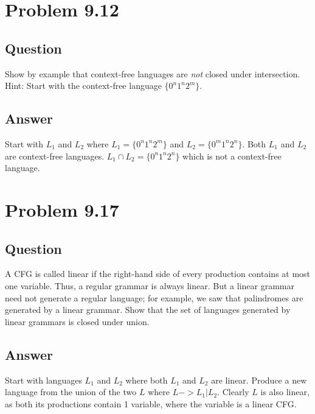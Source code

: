 \documentclass[12pt, a4paper]{article}
\begin{document}
\section{Problem 9.12}
\subsection{Question}
Show by example that context-free languages are \textit{not} closed under intersection. Hint: Start with the context-free language $\{0^{n}1^{n}2^{m}\}$.
\subsection{Answer}
Start with $L_{1}$ and $L_{2}$ where $L_{1} = \{0^{n}1^{n}2^{m}\}$ and $L_{2} = \{0^{m}1^{n}2^{n}\}$. Both $L_{1}$ and $L_{2}$ are context-free languages. $L_{1} \cap L_{2} = \{0^{n}1^{n}2^{n}\}$ which is not a context-free language.

\section{Problem 9.17}
\subsection{Question}
A CFG is called linear if the right-hand side of every production contains at most one variable. Thus, a regular grammar is always linear. But a linear grammar need not generate a regular language; for example, we saw that palindromes are generated by a linear grammar. Show that the set of languages generated by linear grammars is closed under union.
\subsection{Answer}
Start with languages $L_{1}$ and $L_{2}$ where both $L_{1}$ and $L_{2}$ are linear. Produce a new language from the union of the two $L$ where $L -> L_{1} | L_{2}$. Clearly $L$ is also linear, as both its productions contain 1 variable, where the variable is a linear CFG.
\end{document}

